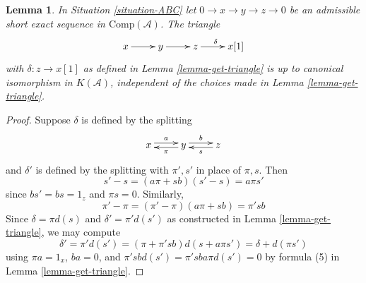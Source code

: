 \documentclass{stacks-project}
\theoremstyle{plain}
\newtheorem{lemma}[subsection]{Lemma}
\theoremstyle{definition}
\theoremstyle{remark}
\numberwithin{equation}{subsection}
\begin{document}
\begin{lemma}
\label{lemma-analogue-triangle-independent-splittings}
In Situation \ref{situation-ABC}
let $0 \to x \to y \to z \to 0$ be an admissible short
exact sequence in $\text{Comp}(\mathcal{A})$. The triangle
$$
\xymatrix{x\ar[r] & y\ar[r] & z\ar[r]^{\delta} & x[1]}
$$
with $\delta : z \to x[1]$ as defined in Lemma \ref{lemma-get-triangle}
is up to canonical isomorphism in $K(\mathcal{A})$, independent of the
choices made in Lemma \ref{lemma-get-triangle}.
\end{lemma}

\begin{proof}
Suppose $\delta$ is defined by the splitting
$$
\xymatrix{
x \ar@<0.5ex>[r]^{a} &
y \ar@<0.5ex>[r]^b\ar@<0.5ex>[l]^{\pi} &
z \ar@<0.5ex>[l]^s
}
$$
and $\delta'$ is defined by the splitting with $\pi',s'$
in place of $\pi,s$. Then
$$
s'-s = (a\pi + sb)(s'-s) = a\pi s'
$$
since $bs' = bs = 1_z$ and $\pi s = 0$. Similarly,
$$
\pi' - \pi = (\pi' - \pi)(a\pi + sb) = \pi'sb
$$
Since $\delta = \pi d(s)$ and $\delta' = \pi'd(s')$
as constructed in Lemma \ref{lemma-get-triangle}, we may compute
$$
\delta' = \pi'd(s') = (\pi + \pi'sb)d(s + a\pi s') = \delta + d(\pi s')
$$
using $\pi a = 1_x$, $ba = 0$, and $\pi'sbd(s') = \pi'sba\pi d(s') = 0$
by formula (5) in Lemma \ref{lemma-get-triangle}.
\end{proof}
\end{document}
